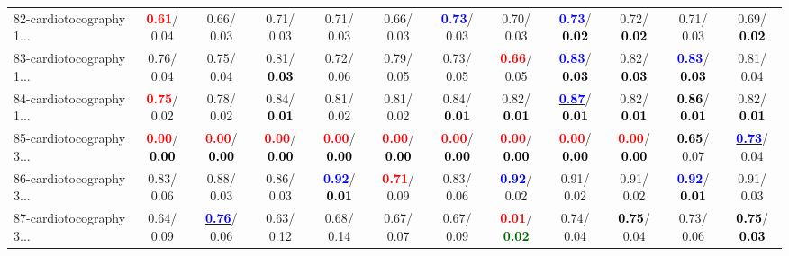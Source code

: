 \begin{table}[h]
\begin{center}
{\begin{tabular}{lc|c|c|c|c|c|c|c|c|c|c}
82-cardiotocography 1... & \textcolor{red}{\textbf{  0.61}}/  0.04 &   0.66/  0.03 &   0.71/  0.03 &   0.71/  0.03 &   0.66/  0.03 & \textcolor{blue}{\textbf{  0.73}}/  0.03 &   0.70/  0.03 & \textcolor{blue}{\textbf{  0.73}}/\textcolor{black}{\textbf{  0.02}} &   0.72/\textcolor{black}{\textbf{  0.02}} &   0.71/  0.03 &   0.69/\textcolor{black}{\textbf{  0.02}} \\
83-cardiotocography 1... &   0.76/  0.04 &   0.75/  0.04 &   0.81/\textcolor{black}{\textbf{  0.03}} &   0.72/  0.06 &   0.79/  0.05 &   0.73/  0.05 & \textcolor{red}{\textbf{  0.66}}/  0.05 & \textcolor{blue}{\textbf{  0.83}}/\textcolor{black}{\textbf{  0.03}} &   0.82/\textcolor{black}{\textbf{  0.03}} & \textcolor{blue}{\textbf{  0.83}}/\textcolor{black}{\textbf{  0.03}} &   0.81/  0.04 \\
84-cardiotocography 1... & \textcolor{red}{\textbf{  0.75}}/  0.02 &   0.78/  0.02 &   0.84/\textcolor{black}{\textbf{  0.01}} &   0.81/  0.02 &   0.81/  0.02 &   0.84/\textcolor{black}{\textbf{  0.01}} &   0.82/\textcolor{black}{\textbf{  0.01}} & \underline{\textcolor{blue}{\textbf{  0.87}}}/\textcolor{black}{\textbf{  0.01}} &   0.82/\textcolor{black}{\textbf{  0.01}} & \textcolor{black}{\textbf{  0.86}}/\textcolor{black}{\textbf{  0.01}} &   0.82/\textcolor{black}{\textbf{  0.01}} \\
85-cardiotocography 3... & \textcolor{red}{\textbf{  0.00}}/\textcolor{black}{\textbf{  0.00}} & \textcolor{red}{\textbf{  0.00}}/\textcolor{black}{\textbf{  0.00}} & \textcolor{red}{\textbf{  0.00}}/\textcolor{black}{\textbf{  0.00}} & \textcolor{red}{\textbf{  0.00}}/\textcolor{black}{\textbf{  0.00}} & \textcolor{red}{\textbf{  0.00}}/\textcolor{black}{\textbf{  0.00}} & \textcolor{red}{\textbf{  0.00}}/\textcolor{black}{\textbf{  0.00}} & \textcolor{red}{\textbf{  0.00}}/\textcolor{black}{\textbf{  0.00}} & \textcolor{red}{\textbf{  0.00}}/\textcolor{black}{\textbf{  0.00}} & \textcolor{red}{\textbf{  0.00}}/\textcolor{black}{\textbf{  0.00}} & \textcolor{black}{\textbf{  0.65}}/  0.07 & \underline{\textcolor{blue}{\textbf{  0.73}}}/  0.04 \\ \hline
86-cardiotocography 3... &   0.83/  0.06 &   0.88/  0.03 &   0.86/  0.03 & \textcolor{blue}{\textbf{  0.92}}/\textcolor{black}{\textbf{  0.01}} & \textcolor{red}{\textbf{  0.71}}/  0.09 &   0.83/  0.06 & \textcolor{blue}{\textbf{  0.92}}/  0.02 &   0.91/  0.02 &   0.91/  0.02 & \textcolor{blue}{\textbf{  0.92}}/\textcolor{black}{\textbf{  0.01}} &   0.91/  0.03 \\
87-cardiotocography 3... &   0.64/  0.09 & \underline{\textcolor{blue}{\textbf{  0.76}}}/  0.06 &   0.63/  0.12 &   0.68/  0.14 &   0.67/  0.07 &   0.67/  0.09 & \textcolor{red}{\textbf{  0.01}}/\textcolor{darkgreen}{\textbf{  0.02}} &   0.74/  0.04 & \textcolor{black}{\textbf{  0.75}}/  0.04 &   0.73/  0.06 & \textcolor{black}{\textbf{  0.75}}/\textcolor{black}{\textbf{  0.03}} \\

\end{tabular}}
\end{center}
\end{table}
